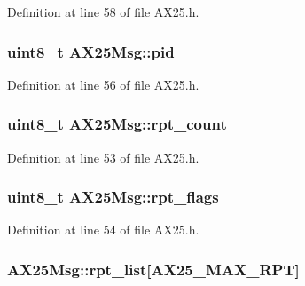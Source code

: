 Definition at line 58 of file A\+X25.\+h.

\subsubsection[{\texorpdfstring{pid}{pid}}]{\setlength{\rightskip}{0pt plus 5cm}uint8\+\_\+t A\+X25\+Msg\+::pid}\hypertarget{struct_a_x25_msg_ae2e8532da38c1a6fac980377ab9b494b}{}\label{struct_a_x25_msg_ae2e8532da38c1a6fac980377ab9b494b}


Definition at line 56 of file A\+X25.\+h.

\subsubsection[{\texorpdfstring{rpt\+\_\+count}{rpt\_count}}]{\setlength{\rightskip}{0pt plus 5cm}uint8\+\_\+t A\+X25\+Msg\+::rpt\+\_\+count}\hypertarget{struct_a_x25_msg_ab4a4b29611190548f3cba0c0f4969f24}{}\label{struct_a_x25_msg_ab4a4b29611190548f3cba0c0f4969f24}


Definition at line 53 of file A\+X25.\+h.

\subsubsection[{\texorpdfstring{rpt\+\_\+flags}{rpt\_flags}}]{\setlength{\rightskip}{0pt plus 5cm}uint8\+\_\+t A\+X25\+Msg\+::rpt\+\_\+flags}\hypertarget{struct_a_x25_msg_a7d77c823411d1c0eded96c29ca7586a5}{}\label{struct_a_x25_msg_a7d77c823411d1c0eded96c29ca7586a5}


Definition at line 54 of file A\+X25.\+h.

\subsubsection[{\texorpdfstring{rpt\+\_\+list}{rpt\_list}}]{ A\+X25\+Msg\+::rpt\+\_\+list\mbox{[}{\bf A\+X25\+\_\+\+M\+A\+X\+\_\+\+R\+PT}\mbox{]}}\hypertarget{struct_a_x25_msg_aca3c075fa9ad0af3cea5c850153e7b83}{}\label{struct_a_x25_msg_aca3c075fa9ad0af3cea5c850153e7b83}


